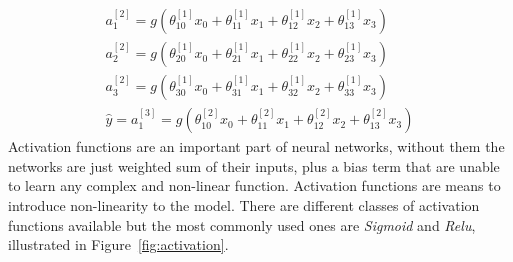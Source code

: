 \begin{equation}
\begin{split}
a_{ 1 }^{ [2] }=g(\theta _{ 10 }^{ [1] }x_{ 0 }+\theta _{ 11 }^{ [1]}x_{ 1 }+\theta _{ 12 }^{ [1] }x_{ 2 }+\theta _{ 13 }^{ [1] }x_{ 3 })\\ 
a_{ 2 }^{ [2] }=g(\theta _{ 20 }^{ [1] }x_{ 0 }+\theta _{ 21 }^{ [1] }x_{ 1 }+\theta _{ 22 }^{ [1] }x_{ 2 }+\theta _{ 23 }^{ [1] }x_{ 3 })\\
 a_{ 3 }^{ [2] }=g(\theta _{ 30 }^{ [1] }x_{ 0 }+\theta _{ 31 }^{ [1] }x_{ 1 }+\theta _{ 32 }^{ [1] }x_{ 2 }+\theta _{ 33 }^{ [1] }x_{ 3 })\\
  \hat { y } =a_{ 1 }^{ [3] }=g(\theta _{ 10 }^{ [2] }x_{ 0 }+\theta _{ 11 }^{ [2] }x_{ 1 }+\theta _{ 12 }^{ [2] }x_{ 2 }+\theta _{ 13 }^{ [2] }x_{ 3 })
\end{split}
\label{eq:nn_eq}
\end{equation}
Activation functions are an important part of neural networks, without them the networks are just weighted sum of their inputs, plus a bias term that are unable to learn any complex and non-linear function. Activation functions are means to introduce non-linearity to the model. There are different classes of activation functions available but the most commonly used ones are \emph{Sigmoid} and \emph{Relu}, illustrated in Figure~\ref{fig:activation}. 

